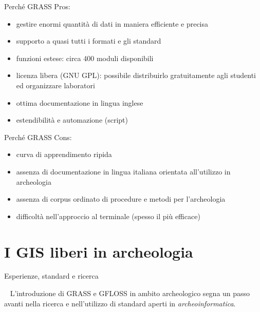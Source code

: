 \documentclass[xcolor=svgnames]{beamer}
\begin{document}

		\begin{frame}{Perché GRASS}
			Pros:\\
			\begin{itemize}
				\item gestire enormi quantità di dati in maniera efficiente e precisa
				\item supporto a quasi tutti i formati e gli standard
				\item funzioni estese: circa 400 moduli disponibili
				\item licenza libera (GNU GPL): possibile distribuirlo gratuitamente agli studenti ed organizzare laboratori
				\item ottima documentazione in lingua inglese
				\item estendibilità e automazione (script)
			\end{itemize}
		\end{frame}


		\begin{frame}{Perché GRASS}
			Cons:\\
			\begin{itemize}
				\item \alert{curva di apprendimento} ripida
				\item assenza di documentazione in lingua italiana orientata all'utilizzo in archeologia
				\item assenza di \alert{corpus ordinato} di procedure e metodi per l'archeologia
				\item difficoltà nell'approccio al terminale (spesso il più efficace)
			\end{itemize}
		\end{frame}

	\section{I GIS liberi in archeologia}

		\begin{frame}{Esperienze, standard e ricerca}
			\begin{beamerboxesrounded}{~}
				L'introduzione di GRASS e GFLOSS in ambito archeologico segna un passo avanti nella ricerca e nell'utilizzo di standard aperti in \emph{archeoinformatica}.
			\end{beamerboxesrounded}
		\end{frame}
\end{document}
